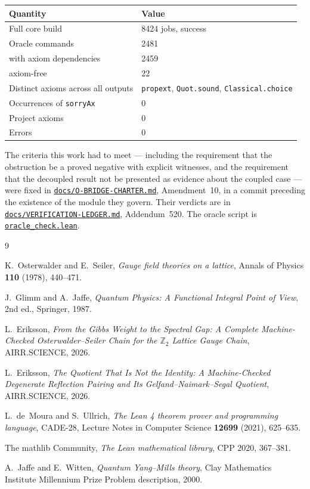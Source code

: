 \documentclass[11pt]{article}
\theoremstyle{definition}
\newcommand{\anchor}{d8187d7f9caa9ce93a58a70a382e98a239942afe}
\newcommand{\repofile}[2]{%
  \href{https://github.com/lluiseriksson/THE-ERIKSSON-PROGRAMME/blob/\anchor/#1}{\nolinkurl{#2}}}
\newcommand{\Z}{\mathbb{Z}}
\begin{document}
\begin{center}
\begin{tabular}{ll}
\toprule
Quantity & Value \\
\midrule
Full core build & 8424 jobs, success \\
Oracle commands & 2481 \\
\quad with axiom dependencies & 2459 \\
\quad axiom-free & 22 \\
Distinct axioms across all outputs & \texttt{propext}, \texttt{Quot.sound}, \texttt{Classical.choice} \\
Occurrences of \texttt{sorryAx} & 0 \\
Project axioms & 0 \\
Errors & 0 \\
\bottomrule
\end{tabular}
\end{center}

The criteria this work had to meet --- including the requirement that the
obstruction be a proved negative with explicit witnesses, and the requirement
that the decoupled result not be presented as evidence about the coupled case
--- were fixed in
\repofile{docs/O-BRIDGE-CHARTER.md}{docs/O-BRIDGE-CHARTER.md}, Amendment~10, in
a commit preceding the existence of the module they govern.  Their verdicts are
in \repofile{docs/VERIFICATION-LEDGER.md}{docs/VERIFICATION-LEDGER.md},
Addendum~520.  The oracle script is
\repofile{oracle\_check.lean}{oracle\_check.lean}.

\begin{thebibliography}{9}

K.~Osterwalder and E.~Seiler,
\emph{Gauge field theories on a lattice},
Annals of Physics \textbf{110} (1978), 440--471.

J.~Glimm and A.~Jaffe,
\emph{Quantum Physics: A Functional Integral Point of View},
2nd ed., Springer, 1987.

L.~Eriksson,
\emph{From the Gibbs Weight to the Spectral Gap: A Complete Machine-Checked
Osterwalder--Seiler Chain for the $\Z_2$ Lattice Gauge Chain}, AIRR.SCIENCE, 2026.

L.~Eriksson,
\emph{The Quotient That Is Not the Identity: A Machine-Checked Degenerate
Reflection Pairing and Its Gelfand--Naimark--Segal Quotient}, AIRR.SCIENCE, 2026.

L.~de~Moura and S.~Ullrich,
\emph{The Lean 4 theorem prover and programming language},
CADE-28, Lecture Notes in Computer Science \textbf{12699} (2021), 625--635.

The mathlib Community,
\emph{The Lean mathematical library},
CPP 2020, 367--381.

A.~Jaffe and E.~Witten,
\emph{Quantum Yang--Mills theory},
Clay Mathematics Institute Millennium Prize Problem description, 2000.

\end{thebibliography}
\end{document}
